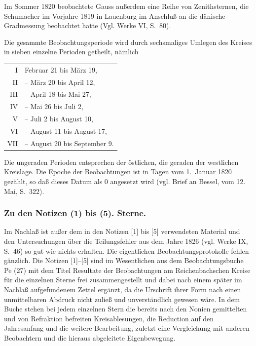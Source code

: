 \documentclass[12pt,a4paper]{article}
\theoremstyle{plain}
\theoremstyle{definition}
\theoremstyle{remark}
\begin{document}
Im Sommer 1820 beobachtete Gauss au\ss erdem eine Reihe von Zenithsternen, die Schumacher im Vorjahre 1819 in Lauenburg im Anschlu\ss{} an die d\"anische Gradmessung beobachtet hatte (Vgl. Werke VI, S.~80).

Die gesammte Beobachtungsperiode wird durch sechsmaliges Umlegen des Kreises in sieben einzelne Perioden getheilt, n\"amlich
\begin{center}
\begin{tabular}{r@{. Periode }l}
I & Februar 21 bis M\"arz 19, \\
II & -- M\"arz 20 bis April 12, \\
III & -- April 18 bis Mai 27, \\
IV & -- Mai 26 bis Juli 2, \\
V & -- Juli 2 bis August 10, \\
VI & -- August 11 bis August 17, \\
VII & -- August 20 bis September 9.
\end{tabular}
\end{center}

Die ungeraden Perioden entsprechen der \"ostlichen, die geraden der westlichen Kreislage. Die Epoche der Beobachtungen ist in Tagen vom 1.~Januar 1820 gez\"ahlt, so da\ss{} dieses Datum als 0 angesetzt wird (vgl. Brief an Bessel, vom 12. Mai, S.~322).

\newpage

\subsubsection*{Zu den Notizen (1) bis (5). Sterne.}

Im Nachla\ss{} ist au\ss er dem in den Notizen [1] bis [5] verwendeten Material und den Untersuchungen \"uber die Teilungsfehler aus dem Jahre 1826 (vgl. Werke IX, S.~46) so gut wie nichts erhalten. Die eigentlichen Beobachtungsprotokolle fehlen g\"anzlich. Die Notizen [1]--[5] sind im Wesentlichen aus dem Beobachtungsbuche Pe (27) mit dem Titel \glqq Resultate der Beobachtungen am Reichenbachschen Kreise f\"ur die einzelnen Sterne\grqq{} frei zusammengestellt und dabei nach einem sp\"ater im Nachla\ss{} aufgefundenem Zettel erg\"anzt, da die Urschrift ihrer Form nach einen unmittelbaren Abdruck nicht zulie\ss{} und unverst\"andlich gewesen w\"are. In dem Buche stehen bei jedem einzelnen Stern die bereits nach den Nonien gemittelten und von Refraktion befreiten Kreisablesungen, die Reduction auf den Jahresanfang und die weitere Bearbeitung, zuletzt eine Vergleichung mit anderen Beobachtern und die hieraus abgeleitete Eigenbewegung.
\end{document}
